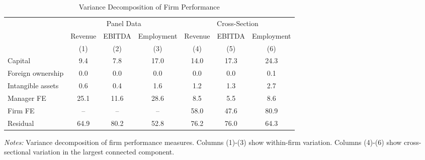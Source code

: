 \begin{table}[htbp]
\centering
\caption{Variance Decomposition of Firm Performance}
\label{tab:variance_decomposition}
\begin{tabular}{l*{6}{c}}
\toprule
 & \multicolumn{3}{c}{Panel Data} & \multicolumn{3}{c}{Cross-Section} \\
\cmidrule(lr){2-4} \cmidrule(lr){5-7}
 & Revenue & EBITDA & Employment & Revenue & EBITDA & Employment \\
 & (1) & (2) & (3) & (4) & (5) & (6) \\
\midrule
Capital &   9.4 &   7.8 &  17.0 &  14.0 &  17.3 &  24.3 \\
Foreign ownership &   0.0 &   0.0 &   0.0 &   0.0 &   0.0 &   0.1 \\
Intangible assets &   0.6 &   0.4 &   1.6 &   1.2 &   1.3 &   2.7 \\
Manager FE &  25.1 &  11.6 &  28.6 &   8.5 &   5.5 &   8.6 \\
Firm FE & -- & -- & -- &  58.0 &  47.6 &  80.9 \\
Residual &  64.9 &  80.2 &  52.8 &  76.2 &  76.0 &  64.3 \\
\bottomrule
\end{tabular}
\begin{minipage}{14cm}
\footnotesize
\textit{Notes:} Variance decomposition of firm performance measures. Columns (1)-(3) show within-firm variation. Columns (4)-(6) show cross-sectional variation in the largest connected component. \end{minipage}
\end{table}
